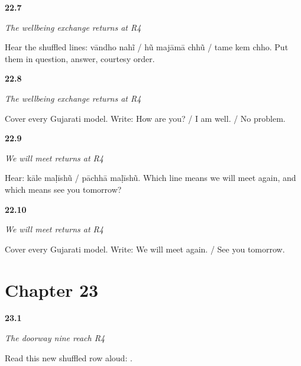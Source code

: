 \noindent\begin{minipage}[t]{\linewidth}
\raggedright
\hypertarget{review-GU-R18-wellbeing-r4-listening}{\textbf{22.7}} \emph{The wellbeing exchange returns at R4}\par
\small Hear the shuffled lines: vāndho nahĩ / hũ majāmā chhũ / tame kem chho. Put them in question, answer, courtesy order.
\end{minipage}\par\medskip

\noindent\begin{minipage}[t]{\linewidth}
\raggedright
\hypertarget{review-GU-R18-wellbeing-r4-writing}{\textbf{22.8}} \emph{The wellbeing exchange returns at R4}\par
\small Cover every Gujarati model. Write: How are you? / I am well. / No problem.
\end{minipage}\par\medskip

\noindent\begin{minipage}[t]{\linewidth}
\raggedright
\hypertarget{review-GU-R18-farewell-r4-listening}{\textbf{22.9}} \emph{We will meet returns at R4}\par
\small Hear: kāle maḷīshũ / pāchhā maḷīshũ. Which line means we will meet again, and which means see you tomorrow?
\end{minipage}\par\medskip

\noindent\begin{minipage}[t]{\linewidth}
\raggedright
\hypertarget{review-GU-R18-farewell-r4-writing}{\textbf{22.10}} \emph{We will meet returns at R4}\par
\small Cover every Gujarati model. Write: We will meet again. / See you tomorrow.
\end{minipage}\par\medskip

\section*{Chapter 23}

\noindent\begin{minipage}[t]{\linewidth}
\raggedright
\hypertarget{review-GU-R19-doorway-nine-r4-reading}{\textbf{23.1}} \emph{The doorway nine reach R4}\par
\small Read this new shuffled row aloud:         .
\end{minipage}\par\medskip


